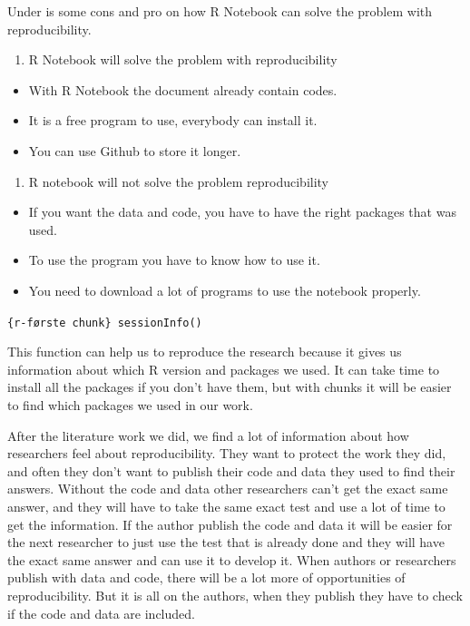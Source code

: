 \documentclass[
  12pt,
]{article}
\providecommand{\tightlist}{%
  \setlength{\itemsep}{0pt}\setlength{\parskip}{0pt}}
\begin{document}
Under is some cons and pro on how R Notebook can solve the problem with
reproducibility.

\begin{enumerate}
\def\labelenumi{\arabic{enumi}.}
\tightlist
\item
  R Notebook will solve the problem with reproducibility
\end{enumerate}

\begin{itemize}
\tightlist
\item
  With R Notebook the document already contain codes.
\item
  It is a free program to use, everybody can install it.
\item
  You can use Github to store it longer.
\end{itemize}

\begin{enumerate}
\def\labelenumi{\arabic{enumi}.}
\setcounter{enumi}{1}
\tightlist
\item
  R notebook will not solve the problem reproducibility
\end{enumerate}

\begin{itemize}
\tightlist
\item
  If you want the data and code, you have to have the right packages
  that was used.
\item
  To use the program you have to know how to use it.
\item
  You need to download a lot of programs to use the notebook properly.
\end{itemize}

\texttt{\{r-første\ chunk\}\ sessionInfo()}

This function can help us to reproduce the research because it gives us
information about which R version and packages we used. It can take time
to install all the packages if you don't have them, but with chunks it
will be easier to find which packages we used in our work.

After the literature work we did, we find a lot of information about how
researchers feel about reproducibility. They want to protect the work
they did, and often they don't want to publish their code and data they
used to find their answers. Without the code and data other researchers
can't get the exact same answer, and they will have to take the same
exact test and use a lot of time to get the information. If the author
publish the code and data it will be easier for the next researcher to
just use the test that is already done and they will have the exact same
answer and can use it to develop it. When authors or researchers publish
with data and code, there will be a lot more of opportunities of
reproducibility. But it is all on the authors, when they publish they
have to check if the code and data are included.
\end{document}
